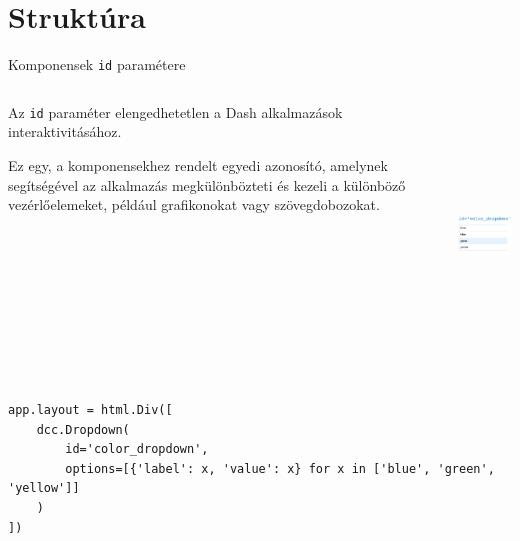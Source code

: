 \documentclass[english, aspectratio=169]{beamer}
\makeatletter
\let\origtableofcontents=\tableofcontents
\def\tableofcontents{\@ifnextchar[{\origtableofcontents}{\gobbletableofcontents}}
\def\gobbletableofcontents#1{\origtableofcontents}
\makeatother
\begin{document}
	\section{Struktúra}
	
	\begin{frame}
		\tableofcontents[currentsection]
	\end{frame}
	
	\begin{frame}[fragile]{Komponensek \texttt{id} paramétere}
		\begin{columns}
			\begin{column}{.5\textwidth}
				Az \texttt{id} paraméter elengedhetetlen a Dash alkalmazások interaktivitásához.\par\smallskip
				Ez egy, a komponensekhez rendelt egyedi azonosító, amelynek segítségével az alkalmazás megkülönbözteti és kezeli a különböző vezérlőelemeket, például grafikonokat vagy szövegdobozokat.
			\end{column}
			\begin{column}{.5\textwidth}
				\begin{center}
					\includegraphics[width=4cm, height=7cm, keepaspectratio]{images/dash_12.png}
				\end{center}
			\end{column}
		\end{columns}
		\medskip
		\begin{lstlisting}
app.layout = html.Div([
	dcc.Dropdown(
		id='color_dropdown',
		options=[{'label': x, 'value': x} for x in ['blue', 'green', 'yellow']]
	)
])				
		\end{lstlisting}
	\end{frame}
	
\end{document}
